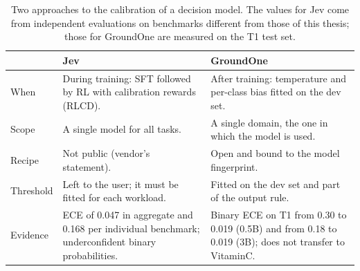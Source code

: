 \begin{table}[htbp]
\centering
\caption{Two approaches to the calibration of a decision model. The values for Jev come from independent evaluations
on benchmarks different from those of this thesis; those for GroundOne are measured on the T1 test set.}
\label{tab:method-calibration-jev}
\small
\begin{tabular}{p{}p{}p{}}
\toprule
 & Jev & GroundOne \\
\midrule
When & During training: SFT followed by RL with calibration rewards (RLCD). & After training: temperature and per-class bias fitted on the dev set. \\ \addlinespace
Scope & A single model for all tasks. & A single domain, the one in which the model is used. \\ \addlinespace
Recipe & Not public (vendor's statement). & Open and bound to the model fingerprint. \\ \addlinespace
Threshold & Left to the user; it must be fitted for each workload. & Fitted on the dev set and part of the output rule. \\ \addlinespace
Evidence & ECE of 0.047 in aggregate and 0.168 per individual benchmark; underconfident binary probabilities. & Binary ECE on T1 from 0.30 to 0.019 (0.5B) and from 0.18 to 0.019 (3B); does not transfer to VitaminC. \\
\bottomrule
\end{tabular}
\end{table}

